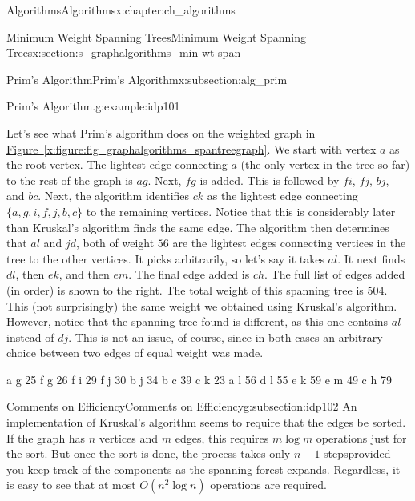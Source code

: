 \documentclass[oneside,10pt,]{book}
\newcommand{\xreffont}{\relax}
\numberwithin{equation}{section}
\begin{document}
\begin{chapterptx}{Algorithms}{}{Algorithms}{}{}{x:chapter:ch_algorithms}
\begin{sectionptx}{Minimum Weight Spanning Trees}{}{Minimum Weight Spanning Trees}{}{}{x:section:s_graphalgorithms_min-wt-span}
\begin{subsectionptx}{Prim's Algorithm}{}{Prim's Algorithm}{}{}{x:subsection:alg_prim}
\begin{example}{Prim's Algorithm.}{g:example:idp101}
\begin{sidebyside}{2}{0.0125}{0.0125}{0.025}
\begin{sbspanel}{0.78}
Let's see what Prim's algorithm does on the weighted graph in \hyperref[x:figure:fig_graphalgorithms_spantreegraph]{Figure~{\xreffont\ref{x:figure:fig_graphalgorithms_spantreegraph}}}. We start with vertex \(a\) as the root vertex. The lightest edge connecting \(a\) (the only vertex in the tree so far) to the rest of the graph is \(ag\). Next, \(fg\) is added. This is followed by \(fi\), \(fj\), \(bj\), and \(bc\). Next, the algorithm identifies \(ck\) as the lightest edge connecting \(\{a,g,i,f,j,b,c\}\) to the remaining vertices. Notice that this is considerably later than Kruskal's algorithm finds the same edge. The algorithm then determines that \(al\) and \(jd\), both of weight \(56\) are the lightest edges connecting vertices in the tree to the other vertices. It picks arbitrarily, so let's say it takes \(al\). It next finds \(dl\), then \(ek\), and then \(em\). The final edge added is \(ch\). The full list of edges added (in order) is shown to the right. The total weight of this spanning tree is \(504\). This (not surprisingly) the same weight we obtained using Kruskal's algorithm. However, notice that the spanning tree found is different, as this one contains \(al\) instead of \(dj\). This is not an issue, of course, since in both cases an arbitrary choice between two edges of equal weight was made.%
\end{sbspanel}%
\begin{sbspanel}{0.17}%
\begin{preformatted}
a g 25
f g 26
f i 29
f j 30
b j 34
b c 39
c k 23
a l 56
d l 55
e k 59
e m 49
c h 79
\end{preformatted}
\end{sbspanel}%
\end{sidebyside}%
\end{example}
\end{subsectionptx}
%
%
\typeout{************************************************}
\typeout{************************************************}
%
\begin{subsectionptx}{Comments on Efficiency}{}{Comments on Efficiency}{}{}{g:subsection:idp102}
An implementation of Kruskal's algorithm seems to require that the edges be sorted. If the graph has \(n\) vertices and \(m\) edges, this requires \(m\log m\) operations just for the sort. But once the sort is done, the process takes only \(n-1\) steps\textemdash{}provided you keep track of the components as the spanning forest expands.  Regardless, it is easy to see that at most \(O(n^2\log n)\) operations are required.%

\end{subsectionptx}
\end{sectionptx}
\end{chapterptx}
\end{document}
